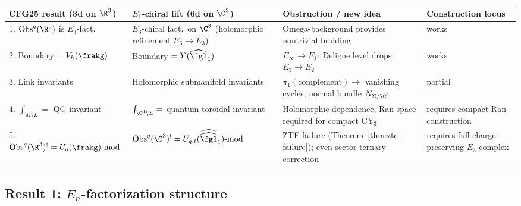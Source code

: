 \begin{center}
\renewcommand{\arraystretch}{1.3}
\small
\begin{tabular}{lp{4.5cm}p{5.5cm}l}
 \toprule
 \textbf{CFG25 result (3d on $\R^3$)} & \textbf{$E_1$-chiral lift (6d on $\C^3$)} & \textbf{Obstruction / new idea} & \textbf{Construction locus} \\
 \midrule
 1. $\mathrm{Obs}^q(\R^3)$ is $E_3$-fact. & $E_3$-chiral fact.\ on $\C^3$ (holomorphic refinement $E_6 \to E_3$) & Omega-background provides nontrivial braiding & works \\
 2. Boundary $= V_k(\frakg)$ & Boundary $= Y(\widehat{\fgl}_1)$ & $E_\infty \to E_1$: Deligne level drops $E_3 \to E_2$ & works \\
 3. Link invariants & Holomorphic submanifold invariants & $\pi_1(\text{complement}) \to$ vanishing cycles; normal bundle $N_{\Sigma/\C^3}$ & partial \\
 4. $\int_{M \setminus L} = $ QG invariant & $\int_{\C^3 \setminus \Sigma} = $ quantum toroidal invariant & Holomorphic dependence; Ran space required for compact CY$_3$ & requires compact Ran construction \\
 5. $\mathrm{Obs}^q(\R^3)^! = U_q(\frakg)\text{-mod}$ & $\mathrm{Obs}^q(\C^3)^! = U_{q,t}(\widehat{\widehat{\fgl}}_1)\text{-mod}$ & ZTE failure (Theorem~\ref{thm:zte-failure}); even-sector ternary correction & requires full charge-preserving $E_3$ complex \\
 \bottomrule
\end{tabular}
\end{center}

\subsection{Result 1: \texorpdfstring{$E_n$}{E-n}-factorization structure}
\label{subsec:cfg25-result1}

